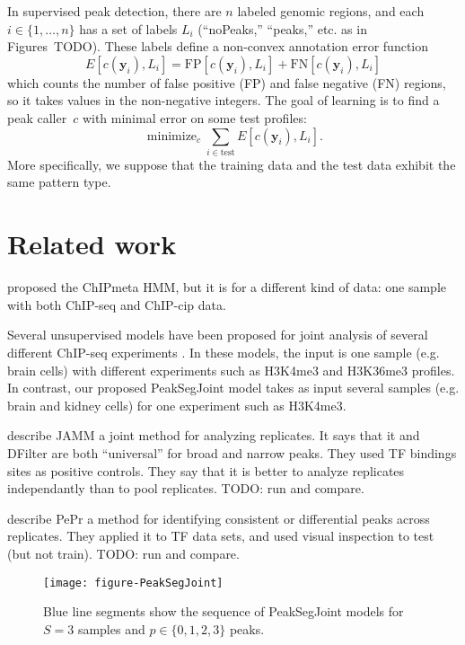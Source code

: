 \documentclass{article} %
\DeclareMathOperator*{\minimize}{minimize}
\begin{document}
In supervised peak detection, there are $n$ labeled genomic regions,
and each $i\in\{1, \dots, n\}$ has a set of labels $L_i$ (``noPeaks,''
``peaks,'' etc. as in Figures~TODO). These labels define a non-convex
annotation error function
\begin{equation}
  \label{eq:error}
  E[c(\mathbf y_i),  L_i] =
  \text{FP}[c(\mathbf y_i), L_i] +
  \text{FN}[c(\mathbf y_i), L_i]
\end{equation}
which counts the number of false positive (FP) and false negative (FN)
regions, so it takes values in the non-negative integers. The goal of
learning is to find a peak caller~$c$ with minimal error on some test
profiles:
\begin{equation}
  \label{eq:min_error}
  \minimize_c \sum_{i\in\text{test}} E[c(\mathbf y_i),  L_i].
\end{equation}
More specifically, we suppose that the training data and the test data
exhibit the same pattern type.
\section{Related work}

\citet{hierarchical-joint} proposed the ChIPmeta HMM, but it is for a
different kind of data: one sample with both ChIP-seq and ChIP-cip
data.

Several unsupervised models have been proposed for joint analysis of
several different ChIP-seq experiments
\citep{jmosaics,segway,chromhmm}. In these models, the input is one
sample (e.g. brain cells) with different experiments such as H3K4me3
and H3K36me3 profiles. In contrast, our proposed PeakSegJoint model
takes as input several samples (e.g. brain and kidney cells) for one
experiment such as H3K4me3.

\citet{JAMM} describe JAMM a joint method for analyzing replicates. It
says that it and DFilter are both ``universal'' for broad and narrow
peaks. They used TF bindings sites as positive controls. They say that
it is better to analyze replicates independantly than to pool
replicates. TODO: run and compare.


\citet{PePr} describe PePr a method for identifying consistent or
differential peaks across replicates. They applied it to TF data sets,
and used visual inspection to test (but not train). TODO: run and
compare.

\begin{figure}[b!]
  \centering
  \texttt{[image: figure-PeakSegJoint]}
  \caption{Blue line segments show the sequence of PeakSegJoint models
    for $S=3$ samples and $p\in\{0, 1, 2, 3\}$ peaks.}
  \label{fig:PeakSegJoint}
\end{figure}
\end{document}
